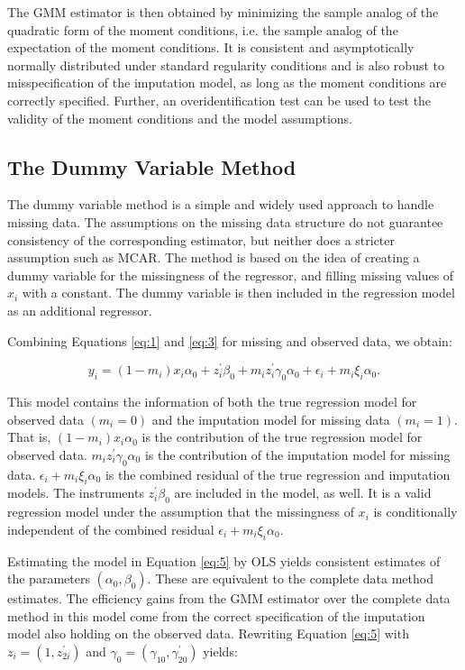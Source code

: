 The GMM estimator is then obtained by minimizing the sample analog of the quadratic form of the moment conditions, i.e. the sample analog of the expectation of the moment conditions.
It is consistent and asymptotically normally distributed under standard regularity conditions and is also robust to misspecification of the imputation model, as long as the moment conditions are correctly specified.
Further, an overidentification test can be used to test the validity of the moment conditions and the model assumptions.

\subsection{The Dummy Variable Method}
\label{subsec:methodology-dummy}
The dummy variable method is a simple and widely used approach to handle missing data.
The assumptions on the missing data structure do not guarantee consistency of the corresponding estimator, but neither does a stricter assumption such as MCAR.
The method is based on the idea of creating a dummy variable for the missingness of the regressor, and filling missing values of $x_i$ with a constant.
The dummy variable is then included in the regression model as an additional regressor.

Combining Equations \eqref{eq:1} and \eqref{eq:3} for missing and observed data, we obtain:

\begin{equation}\label{eq:5}
    y_i = (1-m_i) x_i \alpha_0 + z_i^{\prime} \beta_0 + m_i z_i^{\prime} \gamma_0 \alpha_0 + \epsilon_i + m_i \xi_i \alpha_0.
\end{equation}

This model contains the information of both the true regression model for observed data $(m_i = 0)$ and the imputation model for missing data $(m_i = 1)$.
That is, $(1-m_i) x_i \alpha_0$ is the contribution of the true regression model for observed data.
$m_i z_i^{\prime} \gamma_0 \alpha_0$ is the contribution of the imputation model for missing data.
$\epsilon_i + m_i \xi_i \alpha_0$ is the combined residual of the true regression and imputation models.
The instruments $z_i^{\prime} \beta_0$ are included in the model, as well.
It is a valid regression model under the assumption that the missingness of $x_i$ is conditionally independent of the combined residual $\epsilon_i + m_i \xi_i \alpha_0$.

Estimating the model in Equation \eqref{eq:5} by OLS yields consistent estimates of the parameters $(\alpha_0, \beta_0)$.
These are equivalent to the complete data method estimates.
The efficiency gains from the GMM estimator over the complete data method in this model come from the correct specification of the imputation model also holding on the observed data.
Rewriting Equation \eqref{eq:5} with $z_i = (1, z_{2i}^{\prime})$ and $\gamma_0 = (\gamma_{10}, \gamma_{20}^{\prime})$ yields:

